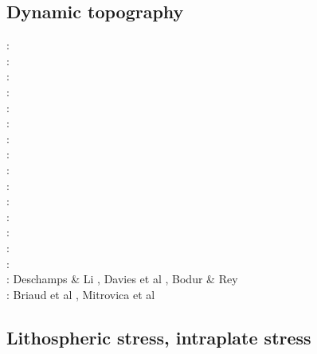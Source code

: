 \subsection{Dynamic topography} 

\begin{scriptsize}
\nineteeneightyfive: \cite{hacr85}\\
\nineteeneightyseven: \cite{repa87}\\
\nineteenninetytwo: \cite{kiha92}\\
\nineteenninetythree: \cite{gurn93}\cite{gurn93b}\\
\nineteenninetynine: \cite{bumo99}\\
\twothousandthree: \cite{cogu03}\\
\twothousandnine: \cite{cohu09}\\
\twothousandten: \cite{bofb10}\cite{brau10}\cite{stfh10}\cite{shml10}\\
\twothousandeleven: \cite{rapy11}\\
\twothousandtwelve: \cite{shlm12}\cite{zhzf12}\\
\twothousandthirteen: \cite{brrs13}\cite{flgm13}\\
\twothousandfifteen: \cite{aupm15}\cite{kiff15}\cite{dali15}\\
\twothousandsixteen: \cite{howa16}\cite{gvfb16}\cite{yagu16}\cite{stei16}\cite{cogb16}\\
\twothousandseventeen: \cite{yamm17}\cite{aumh17}\cite{grrb17}\\
\twothousandeighteen: \cite{osss18}\cite{vibc18}\\
\twothousandnineteen: Deschamps \& Li \cite{deli19}, Davies et al \cite{davk19}, Bodur \& Rey \cite{bore19}\\
\twothousandtwenty: Briaud et al \cite{braf20}, Mitrovica et al \cite{miac20}
\end{scriptsize}


\subsection{Lithospheric stress, intraplate stress}

